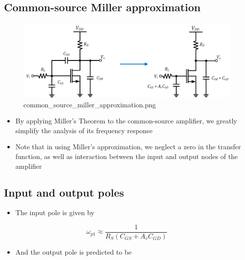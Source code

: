 \documentclass[11pt]{article}
\providecommand{\tightlist}{%
      \setlength{\itemsep}{0pt}\setlength{\parskip}{0pt}}
\begin{document}
    \hypertarget{common-source-miller-approximation}{%
\subsection{Common-source Miller
approximation}\label{common-source-miller-approximation}}

    \begin{figure}
\centering
\includegraphics{common_source_miller_approximation.png}
\caption{common\_source\_miller\_approximation.png}
\end{figure}

    \begin{itemize}
\tightlist
\item
  By applying Miller's Theorem to the common-source amplifier, we
  greatly simplify the analysis of its frequency response
\item
  Note that in using Miller's approximation, we neglect a zero in the
  transfer function, as well as interaction between the input and output
  nodes of the amplifier
\end{itemize}

    \hypertarget{input-and-output-poles}{%
\subsection{Input and output poles}\label{input-and-output-poles}}

    \begin{itemize}
\tightlist
\item
  The input pole is given by
\end{itemize}

\begin{equation}
\omega_{p1} \approx \dfrac{1}{R_S( C_{GS} + A_v C_{GD}) }
\end{equation}

\begin{itemize}
\tightlist
\item
  And the output pole is predicted to be
\end{itemize}
\end{document}
